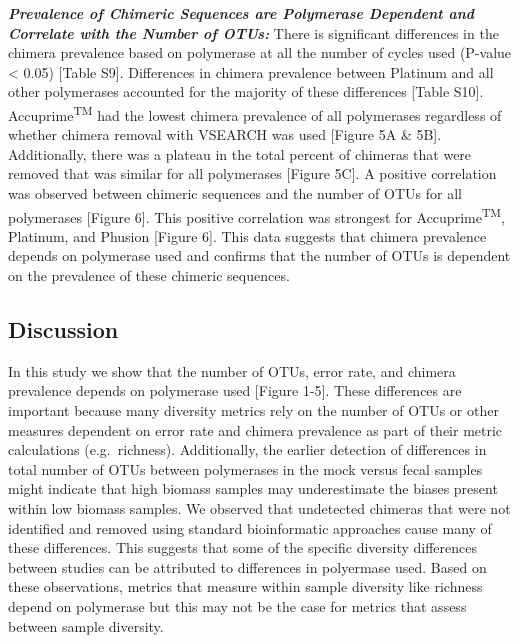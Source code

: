 \documentclass[12pt,]{article}
\begin{document}
\textbf{\emph{Prevalence of Chimeric Sequences are Polymerase Dependent
and Correlate with the Number of OTUs:}} There is significant
differences in the chimera prevalence based on polymerase at all the
number of cycles used (P-value \textless{} 0.05) {[}Table S9{]}.
Differences in chimera prevalence between Platinum and all other
polymerases accounted for the majority of these differences {[}Table
S10{]}. Accuprime\textsuperscript{TM} had the lowest chimera prevalence
of all polymerases regardless of whether chimera removal with VSEARCH
was used {[}Figure 5A \& 5B{]}. Additionally, there was a plateau in the
total percent of chimeras that were removed that was similar for all
polymerases {[}Figure 5C{]}. A positive correlation was observed between
chimeric sequences and the number of OTUs for all polymerases {[}Figure
6{]}. This positive correlation was strongest for
Accuprime\textsuperscript{TM}, Platinum, and Phusion {[}Figure 6{]}.
This data suggests that chimera prevalence depends on polymerase used
and confirms that the number of OTUs is dependent on the prevalence of
these chimeric sequences.

\newpage

\subsection{Discussion}\label{discussion}

In this study we show that the number of OTUs, error rate, and chimera
prevalence depends on polymerase used {[}Figure 1-5{]}. These
differences are important because many diversity metrics rely on the
number of OTUs or other measures dependent on error rate and chimera
prevalence as part of their metric calculations (e.g.~richness).
Additionally, the earlier detection of differences in total number of
OTUs between polymerases in the mock versus fecal samples might indicate
that high biomass samples may underestimate the biases present within
low biomass samples. We observed that undetected chimeras that were not
identified and removed using standard bioinformatic approaches cause
many of these differences. This suggests that some of the specific
diversity differences between studies can be attributed to differences
in polyermase used. Based on these observations, metrics that measure
within sample diversity like richness depend on polymerase but this may
not be the case for metrics that assess between sample diversity.
\end{document}
